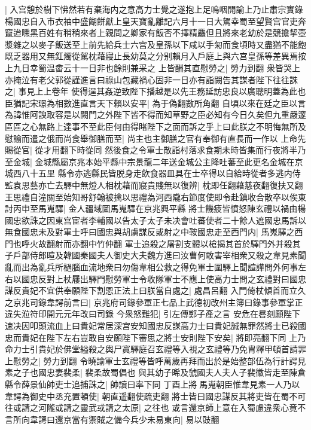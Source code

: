 |{
	入宫憩於樹下怫然若有棄海内之意高力士覺之遂抱上足嗚咽開諭上乃止肅宗實錄楊國忠自入市衣袖中盛餬餅獻上皇天寶亂離記六月十一日大駕幸蜀至望賢宫官吏奔竄迨曛黑百姓有稍稍來者上親問之卿家有飯否不擇精麤但且將來老幼於是競擔挈壺漿雜之以麥子飯送至上前先給兵士六宫及皇孫以下咸以手匊而食頃時又盡猶不能飽既乏器用又無釭燭從駕枕藉寢止長幼莫之分别賴月入戶庭上與六宫皇孫等差異焉按上九日幸蜀温畬云十一日非也餘則兼采之}
上皆酬其直慰勞之|{
	勞力到翻}
衆皆哭上亦掩泣有老父郭從謹進言曰祿山包藏禍心固非一日亦有詣闕告其謀者陛下往往誅之|{
	事見上上卷年}
使得逞其姦逆致陛下播越是以先王務延訪忠良以廣聰明蓋為此也臣猶記宋璟為相數進直言天下賴以安平|{
	為于偽翻數所角翻}
自頃以來在廷之臣以言為諱惟阿諛取容是以闕門之外陛下皆不得而知草野之臣必知有今日久矣但九重嚴邃區區之心無路上達事不至此臣何由得睹陛下之面而訴之乎上曰此朕之不明悔無所及慰諭而遣之俄而尚食舉御膳而至|{
	尚主也主御膳之官有奉御有直長而一作以}
上命先賜從官|{
	從才用翻下時從同}
然後食之令軍士散詣村落求食期未時皆集而行夜將半乃至金城|{
	金城縣屬京兆本始平縣中宗景龍二年送金城公主降吐蕃至此更名金城在京城西八十五里}
縣令亦逃縣民皆脱身走飲食器皿具在士卒得以自給時從者多逃内侍監袁思藝亦亡去驛中無燈人相枕藉而寢貴賤無以復辨|{
	枕即任翻藉慈夜翻復扶又翻}
王思禮自潼關至始知哥舒翰被擒以思禮為河西隴右節度使即令赴鎮收合散卒以俟東討丙申至馬嵬驛|{
	金人疆域圖馬嵬驛在京兆興平縣}
將士饑疲皆憤怒陳玄禮以禍由楊國忠欲誅之因東宫宦者李輔國以告太子太子未决會吐蕃使者二十餘人遮國忠馬訴以無食國忠未及對軍士呼曰國忠與胡虜謀反或射之中鞍國忠走至西門内|{
	馬嵬驛之西門也呼火故翻射而亦翻中竹仲翻}
軍士追殺之屠割支體以槍揭其首於驛門外并殺其子戶部侍郎暄及韓國秦國夫人御史大夫魏方進曰汝曹何敢害宰相衆又殺之韋見素聞亂而出為亂兵所檛腦血流地衆曰勿傷韋相公救之得免軍士圍驛上聞諠譁問外何事左右以國忠反對上杖屨出驛門慰勞軍士令收隊軍士不應上使高力士問之玄禮對曰國忠謀反貴妃不宜供奉願陛下割恩正法上曰朕當自處之|{
	處昌呂翻}
入門倚杖傾首而立久之京兆司錄韋諤前言曰|{
	京兆府司錄參軍正七品上武德初改州主簿曰錄事參軍掌正違失涖符印開元元年改曰司錄}
今衆怒難犯|{
	引左傳鄭子產之言}
安危在晷刻願陛下速决因叩頭流血上曰貴妃常居深宫安知國忠反謀高力士曰貴妃誠無罪然將士已殺國忠而貴妃在陛下左右豈敢自安願陛下審思之將士安則陛下安矣|{
	將即亮翻下同}
上乃命力士引貴妃於佛堂縊殺之輿尸寘驛庭召玄禮等入視之玄禮等乃免胄釋甲頓首請罪上慰勞之|{
	勞力到翻}
令曉諭軍士玄禮等皆呼萬歲再拜而出於是始整部伍為行計諤見素之子也國忠妻裴柔|{
	裴柔故蜀倡也}
與其幼子晞及虢國夫人夫人子裴徽皆走至陳倉縣令薛景仙帥吏士追捕誅之|{
	帥讀曰率下同}
丁酉上將馬嵬朝臣惟韋見素一人乃以韋諤為御史中丞充置頓使|{
	朝直遥翻使疏吏翻}
將士皆曰國忠謀反其將吏皆在蜀不可往或請之河隴或請之靈武㦯請之太原|{
	之往也}
或言還京師上意在入蜀慮違衆心竟不言所向韋諤曰還京當有禦賊之備今兵少未易東向|{
	易以豉翻}

